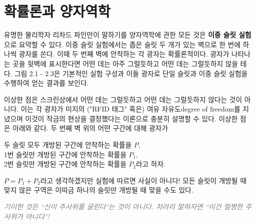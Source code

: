\documentclass[a4paper,chapter,kosection,atbegshi,hidelinks,itemph]{oblivoir}
\begin{document}
\chapter{확률론과 양자역학}

유명한 물리학자 리차드 파인만이 말하기를 양자역학에 관한 모든 것은 \textbf{이중
슬릿 실험}으로 요약할 수 있다. 이중 슬릿 실험에서는 좁은 슬릿 두 개가 있는
벽으로 한 번에 하나씩 광자를 쏜다. 이때 두 번째 벽에 안착하는 각 광자는
확률론적이다. 광자가 나타나는 곳을 뒷벽에 표시한다면 어떤 데는 아주 그럴듯하고
어떤 데는 그럴듯하지 않을 테다. 그림 2.1 - 2.3은 기본적인 실험 구성과
이들 광자로 단일 슬릿과 이중 슬릿 실험을 수행하여 얻는 결과를 보인다. 

이상한 점은 스크린상에서 어떤 데는 그럴듯하고 어떤 데는 그럴듯하지 않다는 것이
아니다. 이는 각 광자가 미지의 ("RFID 태그" 혹은) 여유 자유도{\footnotesize degree
of freedom}를 지녔으며 이것이 작금의 현상을 결정했다는 이론으로 충분히 설명할
수 있다. 이상한 점은 아래와 같다. 두 번째 벽 위의 어떤 구간에 대해 광자가

\hfill

\hfill\parbox[t]{12cm}{
    두 슬릿 모두 개방된 구간에 안착하는 확률을 $P$,\\
    1번 슬릿만 개방된 구간에 안착하는 확률을 $P_1$,\\
    2번 슬릿만 개방된 구간에 안착하는 확률을 $P_2$라고 하자.}

\hfill\break

$P=P_1+P_2$라고 생각하겠지만 실험에 따르면 사실이 아니다! 모든 슬릿이 개방될 때
맞지 않은 구역은 이따금 하나의 슬릿만 개방될 때 맞을 수도 있다. 

\hfill

\hfill\parbox[t]{9cm}{\textcolor{gray}{\slshape 기이한 것은 ``신이 주사위를
굴린다"는 것이 아니다. 차라리 말하자면 ``이건 멀쩡한 주사위가 아니다"!}}
\end{document}
